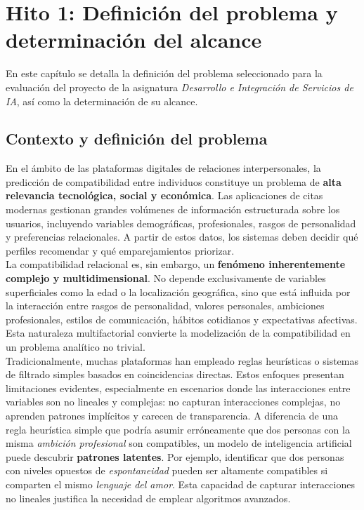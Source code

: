 
\chapter{Hito 1: Definición del problema y determinación del alcance}

En este capítulo se detalla la definición del problema seleccionado para la evaluación del proyecto de la asignatura \textit{Desarrollo e Integración de Servicios de IA}, así como la determinación de su alcance.

\section{Contexto y definición del problema}

En el ámbito de las plataformas digitales de relaciones interpersonales, la predicción de compatibilidad entre individuos constituye un problema de \textbf{alta relevancia tecnológica, social y económica}. Las aplicaciones de citas modernas gestionan grandes volúmenes de información estructurada sobre los usuarios, incluyendo variables demográficas, profesionales, rasgos de personalidad y preferencias relacionales. A partir de estos datos, los sistemas deben decidir qué perfiles recomendar y qué emparejamientos priorizar.\\

La compatibilidad relacional es, sin embargo, un \textbf{fenómeno inherentemente complejo y multidimensional}. No depende exclusivamente de variables superficiales como la edad o la localización geográfica, sino que está influida por la interacción entre rasgos de personalidad, valores personales, ambiciones profesionales, estilos de comunicación, hábitos cotidianos y expectativas afectivas. Esta naturaleza multifactorial convierte la modelización de la compatibilidad en un problema analítico no trivial.\\

Tradicionalmente, muchas plataformas han empleado reglas heurísticas o sistemas de filtrado simples basados en coincidencias directas. Estos enfoques presentan limitaciones evidentes, especialmente en escenarios donde las interacciones entre variables son no lineales y complejas: no capturan interacciones complejas, no aprenden patrones implícitos y carecen de transparencia. A diferencia de una regla heurística simple que podría asumir erróneamente que dos personas con la misma \textit{ambición profesional} son compatibles, un modelo de inteligencia artificial puede descubrir \textbf{patrones latentes}. Por ejemplo, identificar que dos personas con niveles opuestos de \textit{espontaneidad} pueden ser altamente compatibles si comparten el mismo \textit{lenguaje del amor}. Esta capacidad de capturar interacciones no lineales justifica la necesidad de emplear algoritmos avanzados.\\

